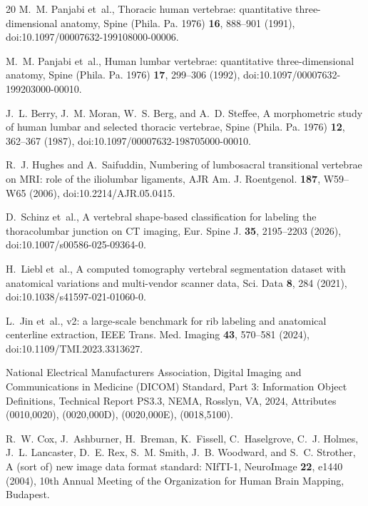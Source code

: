 \documentclass[aapm,mph,amsmath,amssymb,preprint,linenumbers]{revtex4-2}
\begin{document}
\begin{thebibliography}{20}
M.~M. Panjabi et~al.,
\newblock Thoracic human vertebrae: quantitative three-dimensional anatomy,
\newblock Spine (Phila. Pa. 1976) {\bf 16}, 888--901 (1991),
\newblock doi:10.1097/00007632-199108000-00006.

M.~M. Panjabi et~al.,
\newblock Human lumbar vertebrae: quantitative three-dimensional anatomy,
\newblock Spine (Phila. Pa. 1976) {\bf 17}, 299--306 (1992),
\newblock doi:10.1097/00007632-199203000-00010.

J.~L. Berry, J.~M. Moran, W.~S. Berg, and A.~D. Steffee,
\newblock A morphometric study of human lumbar and selected thoracic vertebrae,
\newblock Spine (Phila. Pa. 1976) {\bf 12}, 362--367 (1987),
\newblock doi:10.1097/00007632-198705000-00010.

R.~J. Hughes and A.~Saifuddin,
\newblock Numbering of lumbosacral transitional vertebrae on {MRI}: role of the iliolumbar ligaments,
\newblock AJR Am. J. Roentgenol. {\bf 187}, W59--W65 (2006),
\newblock doi:10.2214/AJR.05.0415.

D.~Schinz et~al.,
\newblock A vertebral shape-based classification for labeling the thoracolumbar junction on {CT} imaging,
\newblock Eur. Spine J. {\bf 35}, 2195--2203 (2026),
\newblock doi:10.1007/s00586-025-09364-0.

H.~Liebl et~al.,
\newblock A computed tomography vertebral segmentation dataset with anatomical variations and multi-vendor scanner data,
\newblock Sci. Data {\bf 8}, 284 (2021),
\newblock doi:10.1038/s41597-021-01060-0.

L.~Jin et~al.,
 v2: a large-scale benchmark for rib labeling and anatomical centerline extraction,
\newblock IEEE Trans. Med. Imaging {\bf 43}, 570--581 (2024),
\newblock doi:10.1109/TMI.2023.3313627.

{National Electrical Manufacturers Association},
\newblock Digital Imaging and Communications in Medicine ({DICOM}) Standard, Part 3: Information Object Definitions,
\newblock Technical Report PS3.3, NEMA, Rosslyn, VA, 2024,
\newblock Attributes (0010,0020), (0020,000D), (0020,000E), (0018,5100).

R.~W. Cox, J.~Ashburner, H.~Breman, K.~Fissell, C.~Haselgrove, C.~J. Holmes, J.~L. Lancaster, D.~E. Rex, S.~M. Smith, J.~B. Woodward, and S.~C. Strother,
\newblock A (sort of) new image data format standard: {NIfTI-1},
\newblock NeuroImage {\bf 22}, e1440 (2004),
\newblock 10th Annual Meeting of the Organization for Human Brain Mapping, Budapest.


\end{thebibliography}
\end{document}
